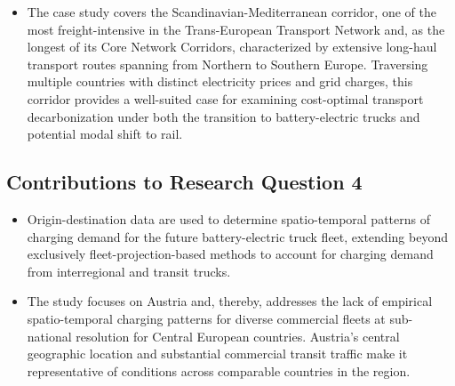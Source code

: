 \begin{itemize}
        \item The case study covers the Scandinavian-Mediterranean corridor, one of the most freight-intensive in the Trans-European Transport Network and, as the longest of its Core Network Corridors, characterized by extensive long-haul transport routes spanning from Northern to Southern Europe. Traversing multiple countries with distinct electricity prices and grid charges, this corridor provides a well-suited case for examining cost-optimal transport decarbonization under both the transition to battery-electric trucks and potential modal shift to rail.
    
    \end{itemize}


    \subsection{Contributions to Research Question 4}

    \begin{itemize}

        \item Origin-destination data are used to determine spatio-temporal patterns of charging demand for the future battery-electric truck fleet, extending beyond exclusively fleet-projection-based methods to account for charging demand from interregional and transit trucks.
        
        \item The study focuses on Austria and, thereby, addresses the lack of empirical spatio-temporal charging patterns for diverse commercial fleets at sub-national resolution for Central European countries. Austria's central geographic location and substantial commercial transit traffic make it representative of conditions across comparable countries in the region.
    \end{itemize}